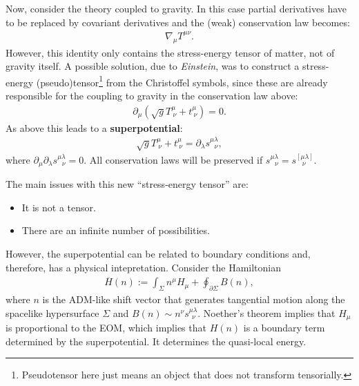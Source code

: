     Now, consider the theory coupled to gravity. In this case partial derivatives have to be replaced by covariant derivatives and the (weak) conservation law becomes:
    \begin{gather}
        \nabla_\mu T^{\mu\nu}.
    \end{gather}
    However, this identity only contains the stress-energy tensor of matter, not of gravity itself. A possible solution, due to \textit{Einstein}, was to construct a stress-energy (pseudo)tensor\footnote{Pseudotensor here just means an object that does not transform tensorially.} from the Christoffel symbols, since these are already responsible for the coupling to gravity in the conservation law above:
    \begin{gather}
        \partial_\mu(\sqrt{g}T^\mu_{\ \nu}+t^\mu_{\ \nu}) = 0.
    \end{gather}
    As above this leads to a \textbf{superpotential}:
    \begin{gather}
        \sqrt{g}T^\mu_{\ \nu}+t^\mu_{\ \nu} = \partial_\lambda s^{\mu\lambda}_{\ \ \ \nu},
    \end{gather}
    where $\partial_\mu\partial_\lambda s^{\mu\lambda}_{\ \ \ \nu}=0$. All conservation laws will be preserved if $s^{\mu\lambda}_{\ \ \ \nu}=s^{[\mu\lambda]}_{\ \ \ \ \nu}$.

    The main issues with this new ``stress-energy tensor'' are:
    \begin{itemize}
        \item It is not a tensor.
        \item There are an infinite number of possibilities.
    \end{itemize}
    However, the superpotential can be related to boundary conditions and, therefore, has a physical intepretation. Consider the Hamiltonian
    \begin{gather}
        \overline{H}(n) := \int_\Sigma n^\mu H_\mu + \oint_{\partial\Sigma}B(n),
    \end{gather}
    where $n$ is the ADM-like shift vector that generates tangential motion along the spacelike hypersurface $\Sigma$ and $B(n)\sim n^\nu s^{\mu\lambda}_{\ \ \nu}$. Noether's theorem implies that $H_\mu$ is proportional to the EOM, which implies that $H(n)$ is a boundary term determined by the superpotential. It determines the quasi-local energy.

